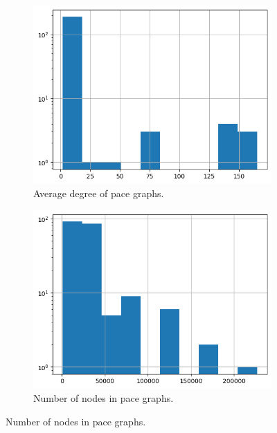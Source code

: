 \documentclass{article}
\begin{document}
\begin{figure}
     \centering
     \begin{subfigure}[b]{0.45\textwidth}
         \centering
         \includegraphics[width=\textwidth]{figures/pace_avg_deg}
         \caption{Average degree of pace graphs.}
         \label{fig:pace_avg_deg}
     \end{subfigure}
     \hfill
     \begin{subfigure}[b]{0.45\textwidth}
         \centering
         \includegraphics[width=\textwidth]{figures/pace_n_nodes}
         \caption{Number of nodes in pace graphs.}
         \label{fig:pace_n_nodes}
     \end{subfigure}
     

\end{figure}
\end{document}
